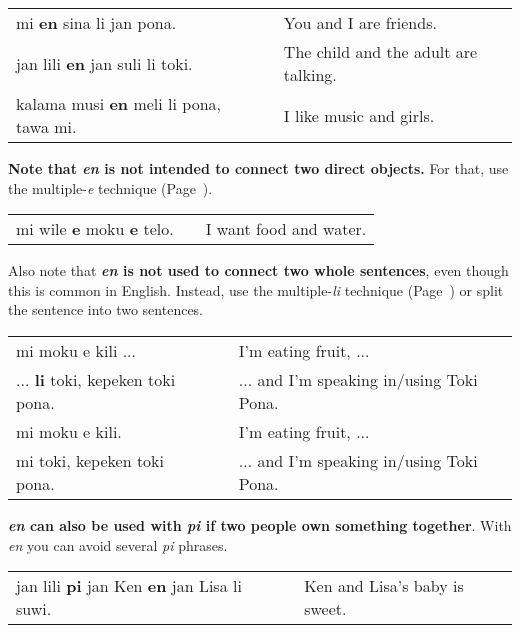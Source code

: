 \begin{supertabular}{p{5,5cm}|ll}
mi \textbf{en} sina li jan pona. && You and I are friends. \\
jan lili \textbf{en} jan suli li toki. && The child and the adult are talking. \\
kalama musi \textbf{en} meli li pona, tawa mi. && I like music and girls. \\
\end{supertabular} 

\textbf{Note that \textit{en} is not intended to connect two direct objects.} 
For that, use the multiple-\textit{e} technique (Page~\pageref{'multiple_e'}). 

\begin{supertabular}{p{5,5cm}|ll}
mi wile \textbf{e} moku \textbf{e} telo. && I want food and water. \\
\end{supertabular} 

Also note that \textbf{\textit{en} is not used to connect two whole sentences}, even though this is common in English. 
Instead, use the multiple-\textit{li} technique  (Page~\pageref{'multiple_li'}) or split the sentence into two sentences. 

\begin{supertabular}{p{5,5cm}|ll}
mi moku e kili ... && I'm eating fruit, ... \\ %
... \textbf{li} toki, kepeken toki pona.  && ... and I'm speaking in/using Toki Pona. \\ %
mi moku e kili.  && I'm eating fruit, ... \\ %
mi toki, kepeken toki pona. && ... and I'm speaking in/using Toki Pona. \\ %
\end{supertabular} 

\textbf{\textit{en} can also be used with \textit{pi} if two people own something together}. 
With \textit{en} you can avoid several \textit{pi} phrases.

\begin{supertabular}{p{5,5cm}|ll}
jan lili \textbf{pi} jan Ken \textbf{en} jan Lisa li suwi. && Ken and Lisa's baby is sweet. \\
\end{supertabular} 
%
